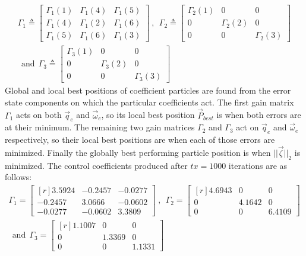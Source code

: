 \begin{multline}\label{eq:simulation-attitde-auxpd-coefficients}
\Gamma_1\triangleq \begin{bmatrix}
\Gamma_1(1) & \Gamma_1(4) & \Gamma_1(5)\\
\Gamma_1(4) & \Gamma_1(2) & \Gamma_1(6)\\
\Gamma_1(5) & \Gamma_1(6) & \Gamma_1(3)
\end{bmatrix}~,~~
\Gamma_2\triangleq \begin{bmatrix}
\Gamma_2(1) & 0 & 0\\
0 &\Gamma_2(2) & 0\\
0 & 0 & \Gamma_2(3)
\end{bmatrix}
\\
~~\text{and}~~\Gamma_3\triangleq \begin{bmatrix}
\Gamma_3(1) & 0 & 0\\
0 & \Gamma_3(2) & 0\\
0 & 0 & \Gamma_3(3)
\end{bmatrix}
\end{multline}
Global and local best positions of coefficient particles are found from the error state components on which the particular coefficients act. The first gain matrix $\Gamma_1$ acts on both $\vec{q}_e$ and $\vec{\omega}_e$, so its local best position $\vec{P}_{best}$ is when both errors are at their minimum. The remaining two gain matrices $\Gamma_2$ and $\Gamma_3$ act on $\vec{q}_e$ and $\vec{\omega}_e$ respectively, so their local best positions are when each of those errors are minimized. Finally the globally best performing particle position is when $||\vec{\zeta}||_2$ is minimized. The control coefficients produced after $tx=1000$ iterations are as follows:
\begin{multline}\label{eq:optimized-auxpd}
\Gamma_1=\begin{bmatrix*}[r]
3.5924 & -0.2457 & -0.0277\\
-0.2457 & 3.0666 & -0.0602\\
-0.0277 & -0.0602 & 3.3809
\end{bmatrix*}~,~~\Gamma_2=\begin{bmatrix*}[r]
4.6943 & 0 & 0\\
0 & 4.1642 & 0\\
0 & 0 & 6.4109
\end{bmatrix*}\\
~~\text{and}~~\Gamma_3=\begin{bmatrix*}[r]
1.1007 & 0 & 0\\
0 & 1.3369 & 0 \\
0 & 0 & 1.1331
\end{bmatrix*}
\end{multline}
